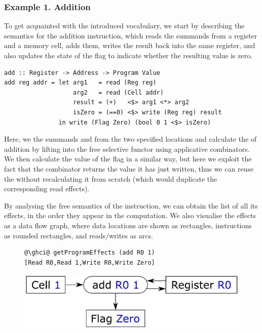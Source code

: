 \vspace{-1mm}
\subsubsection{Example 1. Addition}
To get acquainted with the introduced vocabulary, we start by describing the
semantics for the addition instruction, which reads the summands from a
register and a memory cell, adds them, writes the result back into the same
register, and also updates the state of the  flag to indicate whether
the resulting value is zero.

\vspace{1mm}
\begin{verbatim}
add :: Register -> Address -> Program Value
add reg addr = let arg1   = read (Reg reg)
                   arg2   = read (Cell addr)
                   result = (+)   <$> arg1 <*> arg2
                   isZero = (==0) <$> write (Reg reg) result
               in write (Flag Zero) (bool 0 1 <$> isZero)
\end{verbatim}
\vspace{1mm}

\noindent
Here, we  the summands  and  from the two specified
locations and calculate the  of addition by lifting \hs{(+)} into the
free selective functor using applicative combinators. We then calculate the
value of the  flag in a similar way, but here we exploit the fact that
the  combinator returns the value it has just written, thus we can
reuse the  without recalculating it from scratch (which would
duplicate the corresponding read effects).

By analysing the free semantics of the  instruction, we can obtain the
list of all its effects, in the order they appear in the computation. We also
visualise the effects as a data flow graph, where data locations are shown as
rectangles, instructions as rounded rectangles, and reads/writes as arcs.


\begin{figure}[!h]
\begin{minipage}{0.53\textwidth}
\raggedleft
\begin{verbatim}
@\ghci@ getProgramEffects (add R0 1)
[Read R0,Read 1,Write R0,Write Zero]
\end{verbatim}
 \end{minipage}
 \begin{minipage}{0.44\textwidth}
  \centering
  \includegraphics[scale=0.3]{fig/add.pdf}
 \end{minipage}
\end{figure}

